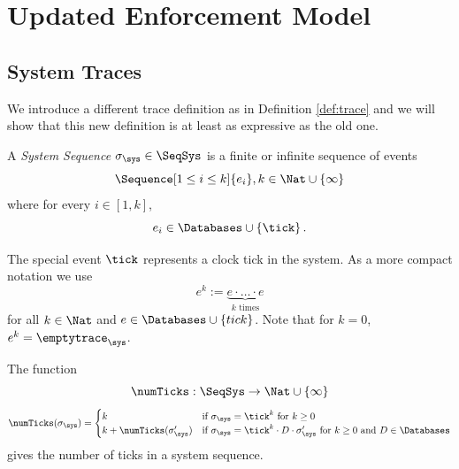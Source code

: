 \section{Updated Enforcement Model}
\label{section:updated-enforcement-model}

\subsection{System Traces}
\label{subsection:system-traces}
We introduce a different trace definition as in Definition \ref{def:trace}
and we will show that this new definition is at least as expressive as
the old one.

\begin{definition}
    \label{def:system-sequence}
    A \emph{System Sequence} $\sigma_\sys \in \SeqSys$ 
    is a finite or infinite sequence of events
    \begin{equation*}
        \Sequence[1 \leq i \leq k]{e_i},
        k \in \Nat \cup \lbrace \infty \rbrace
    \end{equation*}
    where for every $i \in [1, k]$,
    \begin{equation*}
        e_i \in  \Databases \cup \left\{ \tick \right\}.
    \end{equation*}
\end{definition}
The special event $\tick$ represents a clock tick in the system.
As a more compact notation we use
$$e^k := \underbrace{e \cdot \ldots \cdot e}_{k \text{ times}}$$ for all $k \in \Nat$
and $e \in \Databases \cup \{tick\}$. Note that for $k=0$, $e^k = \emptytrace_\sys$.

\begin{definition}
    \label{def:num-ticks}
    The function
    \begin{equation*}
        \numTicks : \SeqSys \to \Nat \cup \{ \infty \}
    \end{equation*}
    \begin{align*}
        \numTicks(\sigma_\sys) =
        \begin{cases}
            k
                &\text{if } \sigma_\sys = \tick^k
                \text{ for } k \geq 0 \\
            k + \numTicks(\sigma'_\sys)
                &\text{if } \sigma_\sys = \tick^k \cdot D \cdot \sigma'_\sys
                \text{ for } k \geq 0
                \text{ and } D \in \Databases
        \end{cases}
    \end{align*}
    gives the number of ticks in a system sequence.
\end{definition}


